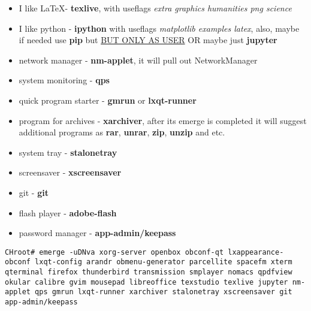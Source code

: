 \documentclass[10pt,a4paper]{article}
\begin{document}
\begin{itemize}
                        \item I like \LaTeX - \textbf{texlive}, with useflags \textit{extra graphics humanities png science}
                        \item I like python - \textbf{ipython} with useflags \textit{matplotlib examples latex}, also, maybe if needed use \textbf{pip} but \href{https://wiki.gentoo.org/wiki/Pip#Invocation}{BUT ONLY AS USER} OR maybe just \textbf{jupyter}
                        \item network manager - \textbf{nm-applet}, it will pull out NetworkManager
                        \item system monitoring - \textbf{qps}
                        \item quick program starter - \textbf{gmrun} or \textbf{lxqt-runner}
                        \item program for archives - \textbf{xarchiver}, after its emerge is completed it will suggest additional programs as \textbf{rar}, \textbf{unrar}, \textbf{zip}, \textbf{unzip} and etc.
                        \item system tray - \textbf{stalonetray}
                        \item screensaver - \textbf{xscreensaver}
                        \item git - \textbf{git}
                        \item flash player - \textbf{adobe-flash}
                        \item password manager - \textbf{app-admin/keepass}
                    \end{itemize}

                    \begin{lstlisting}[style=BashInputCHRoot]
 CHroot# emerge -uDNva xorg-server openbox obconf-qt lxappearance-obconf lxqt-config arandr obmenu-generator parcellite spacefm xterm qterminal firefox thunderbird transmission smplayer nomacs qpdfview okular calibre gvim mousepad libreoffice texstudio texlive jupyter nm-applet qps gmrun lxqt-runner xarchiver stalonetray xscreensaver git app-admin/keepass
                    \end{lstlisting}
\end{document}
